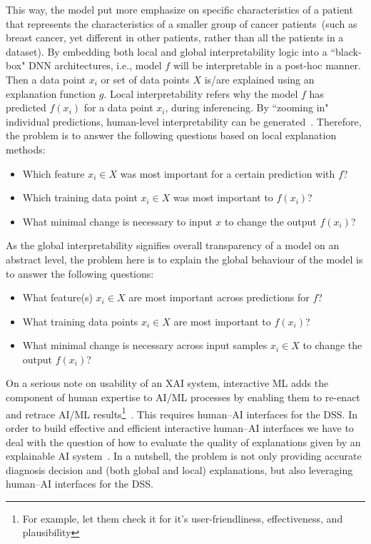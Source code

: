 \hspace*{3.5mm} This way, the model put more emphasize on specific characteristics of a patient that represents the characteristics of a smaller group of cancer patients~(such as breast cancer, yet different in other patients, rather than all the patients in a dataset). By embedding both local and global interpretability logic into a ``black-box" DNN architectures, i.e., model $f$ will be interpretable in a post-hoc manner. Then a data point $x_i$ or set of data points $X$ is/are explained using an explanation function $g$. Local interpretability refers why the model $f$ has predicted $f(x_i)$ for a data point $x_i$, during inferencing. By ``zooming in" individual predictions, human-level interpretability can be generated~\cite{ribeiro2018anchors}. Therefore, the problem is to answer the following questions based on local explanation methods: 

\begin{itemize}[noitemsep]
    \item Which feature $x_i \in X$ was most important for a certain prediction with $f$? 
    \item Which training data point $x_i \in X$ was most important to $f(x_i)$? 
    \item What minimal change is necessary to input $x$ to change the output $f(x_i)$?
\end{itemize}

\hspace*{3.5mm} As the global interpretability signifies overall transparency of a model on an abstract level, the problem here is to explain the global behaviour of the model is to answer the following questions: 

\begin{itemize}[noitemsep]
    \item What feature(s) $x_i \in X$ are most important across predictions for $f$?
    \item What training data points $x_i \in X$ are most important to $f(x_i)$? 
    \item What minimal change is necessary across input samples $x_i \in X$ to change the output $f(x_i)$?
\end{itemize}

\hspace*{3.5mm} On a serious note on usability of an XAI system, interactive ML adds the component of human expertise to AI/ML processes by enabling them to re-enact and retrace AI/ML results\footnote{For example, let them check it for it's user-friendliness, effectiveness, and plausibility}~\cite{holzinger2020measuring}. This requires human–AI interfaces for the DSS. In order to build effective and efficient interactive human–AI interfaces we have to deal with the question of how to evaluate the quality of explanations given by an explainable AI system~\cite{holzinger2020measuring}. In a nutshell, the problem is not only providing accurate diagnosis decision and (both global and local) explanations, but also leveraging human–AI interfaces for the DSS.   

